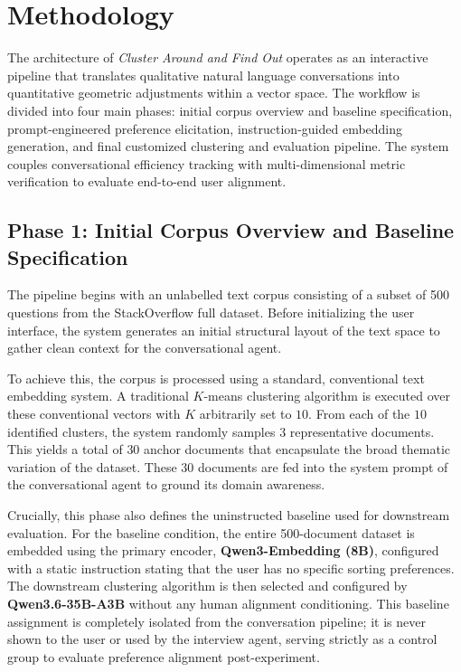\section{Methodology}
\label{sec:methodology}

The architecture of \textit{Cluster Around and Find Out} operates as an interactive pipeline that translates qualitative natural language conversations into quantitative geometric adjustments within a vector space. 
The workflow is divided into four main phases: initial corpus overview and baseline specification, prompt-engineered preference elicitation, instruction-guided embedding generation, and final customized clustering and evaluation pipeline. 
The system couples conversational efficiency tracking with multi-dimensional metric verification to evaluate end-to-end user alignment.

\subsection{Phase 1: Initial Corpus Overview and Baseline Specification}
The pipeline begins with an unlabelled text corpus consisting of a subset of 500 questions from the StackOverflow full dataset.
Before initializing the user interface, the system generates an initial structural layout of the text space to gather clean context for the conversational agent. 

To achieve this, the corpus is processed using a standard, conventional text embedding system. 
A traditional $K$-means clustering algorithm is executed over these conventional vectors with $K$ arbitrarily set to $10$. 
From each of the $10$ identified clusters, the system randomly samples $3$ representative documents. 
This yields a total of $30$ anchor documents that encapsulate the broad thematic variation of the dataset. 
These $30$ documents are fed into the system prompt of the conversational agent to ground its domain awareness.

Crucially, this phase also defines the uninstructed baseline used for downstream evaluation. 
For the baseline condition, the entire 500-document dataset is embedded using the primary encoder, \textbf{Qwen3-Embedding (8B)}, configured with a static instruction stating that the user has no specific sorting preferences.
The downstream clustering algorithm is then selected and configured by \textbf{Qwen3.6-35B-A3B} without any human alignment conditioning.
This baseline assignment is completely isolated from the conversation pipeline; 
it is never shown to the user or used by the interview agent, serving strictly as a control group to evaluate preference alignment post-experiment.

